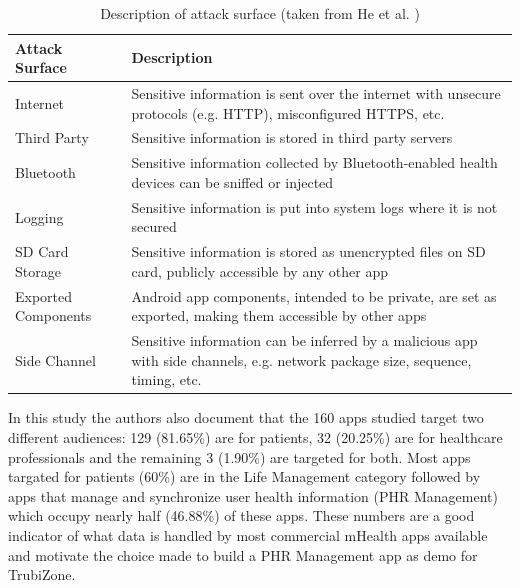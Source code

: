 \begin{table}
	\caption {Description of attack surface (taken from He et al. \cite{he2014security})}
	\label{tab:attacksurfaces}
	\begin{tabular}{|>{\raggedright}p{2cm}|>{\raggedright\arraybackslash}p{10cm}|}
		\hline
		\textbf{Attack Surface}      & \textbf{Description}                                                                                                                    \\ \hline
		Internet            & Sensitive information is sent over the internet with unsecure protocols (e.g. HTTP), misconfigured HTTPS, etc.                 \\ \hline
		Third Party         & Sensitive information is stored in third party servers                                                                         \\ \hline
		Bluetooth           & Sensitive information collected by Bluetooth-enabled health devices can be sniffed or injected                                 \\ \hline
		Logging             & Sensitive information is put into system logs where it is not secured                                                          \\ \hline
		SD Card Storage     & Sensitive information is stored as unencrypted files on SD card, publicly accessible by any other app                          \\ \hline
		Exported Components &  Android app components, intended to be private, are set as exported, making them accessible by other apps                     \\ \hline
		Side Channel        & Sensitive information can be inferred by a malicious app with side channels, e.g. network package size, sequence, timing, etc. \\ \hline
	\end{tabular}
\end{table}
\FloatBarrier

In this study the authors also document that the 160 apps studied target two different audiences: 129 (81.65\%) are for patients, 32 (20.25\%) are for healthcare professionals and the remaining 3 (1.90\%) are targeted for both. Most apps targated for patients (60\%) are in the Life Management category followed by apps that manage and synchronize user health information (PHR Management) which occupy nearly half (46.88\%) of these apps. These numbers are a good indicator of what data is handled by most commercial mHealth apps available and motivate the choice made to build a PHR Management app as demo for TrubiZone.

